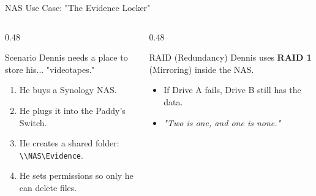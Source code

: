 \documentclass[aspectratio=169]{beamer}  %
\begin{document}
\begin{frame}{NAS Use Case: "The Evidence Locker"}
    \begin{columns}[T]
        \begin{column}{0.48\textwidth}
            \begin{exampleblock}{Scenario}
                \small
                Dennis needs a place to store his... "videotapes."
                \begin{enumerate}
                    \item He buys a Synology NAS.
                    \item He plugs it into the Paddy's Switch.
                    \item He creates a shared folder: \texttt{\textbackslash\textbackslash NAS\textbackslash Evidence}.
                    \item He sets permissions so only he can delete files.
                \end{enumerate}
            \end{exampleblock}
        \end{column}
        \begin{column}{0.48\textwidth}
            \begin{block}{RAID (Redundancy)}
                \small
                Dennis uses \textbf{RAID 1} (Mirroring) inside the NAS.
                \begin{itemize}
                    \item If Drive A fails, Drive B still has the data.
                    \item \textit{"Two is one, and one is none."}
                \end{itemize}
            \end{block}
            \begin{center}
            \end{center}
        \end{column}
    \end{columns}
\end{frame}
\end{document}
